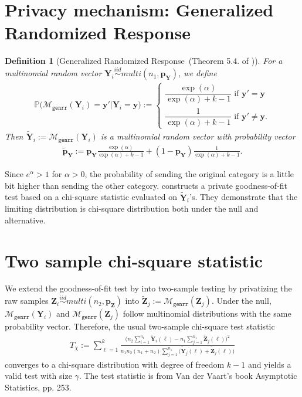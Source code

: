 \documentclass[11pt]{article} %
\newcommand{\vecBold}[1]{\boldsymbol{#1}} %
\newcommand{\sampleSize}{n}
\newcommand{\distparamMultinom}{\boldsymbol{p}}
\newcommand{\mP}{\mathbb{P}} %
\newcommand{\alphabetSize}{k}
\newcommand{\genrr}{\mathcal{M}_{\texttt{genrr}}}
\newcommand{\rvY}{Y}
\newcommand{\rVecY}{\vecBold{\rvY}}
\newcommand{\rvZ}{Z}
\newcommand{\rVecZ}{\vecBold{\rvZ}}
\newtheorem{definition}{Definition}[section]
\begin{document}
\section{Privacy mechanism: Generalized Randomized Response}
\begin{definition}[Generalized Randomized Response~(Theorem 5.4. of \citet{Gaboardi2018LDPChisq})]
For a multinomial random vector 
$
\rVecY_i \stackrel{iid}{\sim}multi(\sampleSize_1, \distparamMultinom_{\rVecY})$, 
we define
\begin{align*}
\mP
\bigl(
\genrr(\rVecY_i) = \vecBold{y}'
|
\rVecY_i = \vecBold{y}
\bigr)
:=
\begin{cases}
\dfrac
	{\exp(\alpha)}
	{\exp(\alpha) + \alphabetSize - 1 }
	\text{ if }
	\vecBold{y}' = \vecBold{y}
	\\
\dfrac
	{1}
	{\exp(\alpha) + \alphabetSize - 1 }	
	\text{ if }
	\vecBold{y}' \neq \vecBold{y}.
\end{cases}
\end{align*}
Then  $\tilde{\rVecY}_i:=\genrr(\rVecY_i)$ is a multinomial random vector with probability vector
\begin{align*}
\tilde{\distparamMultinom}_{\rVecY}
:=
\distparamMultinom_{\rVecY}
	\frac
	{\exp(\alpha)}
	{\exp(\alpha) + \alphabetSize - 1 }
	+
(1-\distparamMultinom_{\rVecY})	
	\frac
	{1}
	{\exp(\alpha) + \alphabetSize - 1 }.
\end{align*}
\end{definition}
\noindent
Since $e^\alpha>1$ for $\alpha>0$, the probability of sending the original category is a little bit higher than sending the other category.
\citet{Gaboardi2018LDPChisq} constructs a private goodness-of-fit test based on a chi-square statistic evaluated on $\tilde{\rVecY}_i$'s.
They demonstrate that the limiting distribution is chi-square distribution both under the null and alternative.



\section{Two sample chi-square statistic}
We extend the goodness-of-fit test by \citet{Gaboardi2018LDPChisq} into two-sample testing by privatizing the raw samples
$\rVecZ_i \stackrel{iid}{\sim}multi(\sampleSize_2, \distparamMultinom_{\rVecZ})$
into $\tilde{\rVecZ}_j := \genrr(\rVecZ_j)$. 
Under the null, $\genrr(\rVecY_i)$ and $\genrr(\rVecZ_j)$ follow multinomial distributions with the same probability vector.
 Therefore, the usual two-sample chi-square test statistic
 	\begin{align*}
		T_{\chi} :=
		\sum_{\ell=1}^k
		\frac{
		\bigl(
		n_2
		\sum_{i=1}^{n_1}\tilde{\rVecY}_i(\ell)
		-
		n_1
		\sum_{j=1}^{n_1}\tilde{\rVecZ}_j(\ell)
		\bigr)^2
		}{
		n_1 n_2 (n_1 + n_2) 
		\sum_{j=1}^{n_1}
		\bigl(
		\tilde{\rVecY}_j(\ell)+\tilde{\rVecZ}_j(\ell)
		\bigr)
		}
	\end{align*}
  converges to a chi-square distribution with degree of freedom $\alphabetSize-1$ and yields a valid  test with size $\gamma$.
The test statistic is from Van der Vaart's book Asymptotic Statistics, pp. 253.
\end{document}
